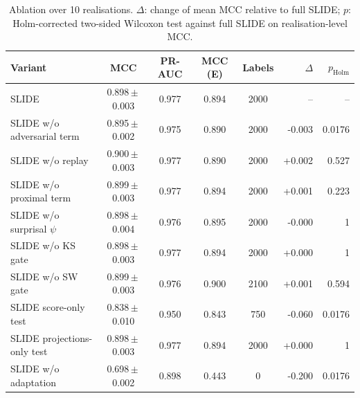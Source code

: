 \begin{table}[t]
\centering
\caption{Ablation over 10 realisations. $\Delta$: change of mean MCC relative to full SLIDE; $p$: Holm-corrected two-sided Wilcoxon test against full SLIDE on realisation-level MCC.}
\label{tab:ablation}
\scriptsize
\setlength{\tabcolsep}{2.5pt}
\begin{tabular}{@{}lccccrr@{}}
\toprule
Variant & MCC & PR-AUC & MCC (E) & Labels & $\Delta$ & $p_{\mathrm{Holm}}$ \\
\midrule
SLIDE & 0.898\,$\pm$\,0.003 & 0.977 & 0.894 & 2000 & -- & -- \\
SLIDE w/o adversarial term & 0.895\,$\pm$\,0.002 & 0.975 & 0.890 & 2000 & -0.003 & 0.0176 \\
SLIDE w/o replay & 0.900\,$\pm$\,0.003 & 0.977 & 0.890 & 2000 & +0.002 & 0.527 \\
SLIDE w/o proximal term & 0.899\,$\pm$\,0.003 & 0.977 & 0.894 & 2000 & +0.001 & 0.223 \\
SLIDE w/o surprisal $\psi$ & 0.898\,$\pm$\,0.004 & 0.976 & 0.895 & 2000 & -0.000 & 1 \\
SLIDE w/o KS gate & 0.898\,$\pm$\,0.003 & 0.977 & 0.894 & 2000 & +0.000 & 1 \\
SLIDE w/o SW gate & 0.899\,$\pm$\,0.003 & 0.976 & 0.900 & 2100 & +0.001 & 0.594 \\
SLIDE score-only test & 0.838\,$\pm$\,0.010 & 0.950 & 0.843 & 750 & -0.060 & 0.0176 \\
SLIDE projections-only test & 0.898\,$\pm$\,0.003 & 0.977 & 0.894 & 2000 & +0.000 & 1 \\
SLIDE w/o adaptation & 0.698\,$\pm$\,0.002 & 0.898 & 0.443 & 0 & -0.200 & 0.0176 \\
\bottomrule
\end{tabular}
\end{table}
